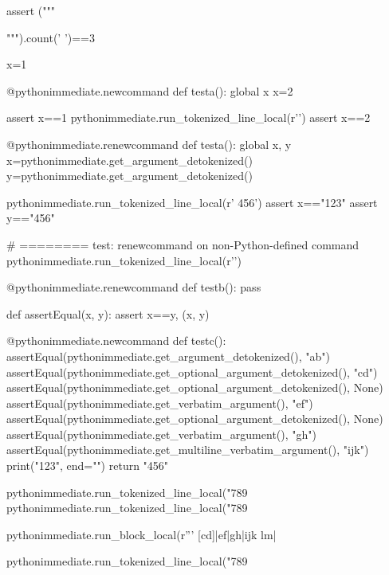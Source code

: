\documentclass[a5paper]{article}
\begin{document}
\begin{pycode}
assert ("""
   
""").count(' ')==3


x=1

@pythonimmediate.newcommand
def testa():
	global x
	x=2

assert x==1
pythonimmediate.run_tokenized_line_local(r'\testa')
assert x==2

@pythonimmediate.renewcommand
def testa():
	global x, y
	x=pythonimmediate.get_argument_detokenized()
	y=pythonimmediate.get_argument_detokenized()


pythonimmediate.run_tokenized_line_local(r' {456}')
assert x=="123"
assert y=="456"


# ======== test: renewcommand on non-Python-defined command
pythonimmediate.run_tokenized_line_local(r'\def \testb {}')

@pythonimmediate.renewcommand
def testb(): pass


def assertEqual(x, y):
	assert x==y, (x, y)

@pythonimmediate.newcommand
def testc():
	assertEqual(pythonimmediate.get_argument_detokenized(), "ab")
	assertEqual(pythonimmediate.get_optional_argument_detokenized(), "cd")
	assertEqual(pythonimmediate.get_optional_argument_detokenized(), None)
	assertEqual(pythonimmediate.get_verbatim_argument(), "ef")
	assertEqual(pythonimmediate.get_optional_argument_detokenized(), None)
	assertEqual(pythonimmediate.get_verbatim_argument(), "gh")
	assertEqual(pythonimmediate.get_multiline_verbatim_argument(), "ijk\nlm")
	print("123", end="")
	return "456"

pythonimmediate.run_tokenized_line_local("789%
pythonimmediate.run_tokenized_line_local("789%

pythonimmediate.run_block_local(r''' [cd]|ef|{gh}|ijk
lm|%

pythonimmediate.run_tokenized_line_local("789%

\end{pycode}
\end{document}
